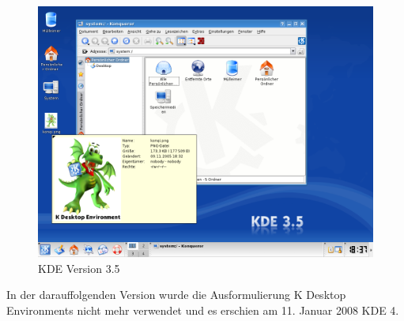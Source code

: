 \begin{figure}[h]
	\centering
	\includegraphics[width=\linewidth]{images/KDE_35.png}
	\caption{KDE Version 3.5 \cite{kdeversionenwiki}}
	\label{fig:kdeversion3}
\end{figure}

In der darauffolgenden Version wurde die Ausformulierung K Desktop Environments nicht mehr verwendet und es erschien am  11. Januar 2008 KDE 4.


